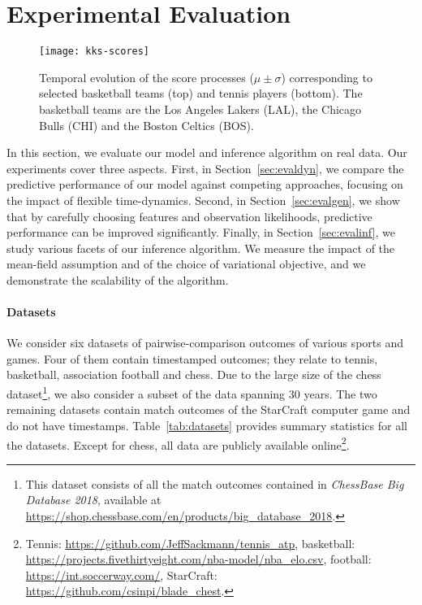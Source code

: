 \section{Experimental Evaluation}
\label{sec:eval}

\begin{figure*}[t]
	\texttt{[image: kks-scores]}
	\caption{
		Temporal evolution of the score processes ($\mu \pm \sigma$) corresponding to selected basketball teams (top) and tennis players (bottom).
		The basketball teams are the Los Angeles Lakers (LAL), the Chicago Bulls (CHI) and the Boston Celtics (BOS).}
	\label{fig:scores}
\end{figure*}

In this section, we evaluate our model and inference algorithm on real data.
Our experiments cover three aspects.
First, in Section~\ref{sec:evaldyn}, we compare the predictive performance of our model against competing approaches, focusing on the impact of flexible time-dynamics.
Second, in Section~\ref{sec:evalgen}, we show that by carefully choosing features and observation likelihoods, predictive performance can be improved significantly.
Finally, in Section~\ref{sec:evalinf}, we study various facets of our inference algorithm.
We measure the impact of the mean-field assumption and of the choice of variational objective, and we demonstrate the scalability of the algorithm.

\paragraph{Datasets}
We consider six datasets of pairwise-comparison outcomes of various sports and games.
Four of them contain timestamped outcomes; they relate to tennis, basketball, association football and chess.
Due to the large size of the chess dataset\footnote{%
	This dataset consists of all the match outcomes contained in \emph{ChessBase Big Database 2018}, available at \url{https://shop.chessbase.com/en/products/big_database_2018}.}, we also consider a subset of the data spanning 30 years.
The two remaining datasets contain match outcomes of the StarCraft computer game and do not have timestamps.
Table~\ref{tab:datasets} provides summary statistics for all the datasets.
Except for chess, all data are publicly available online\footnote{%
	Tennis: \url{https://github.com/JeffSackmann/tennis_atp},
	basketball: \url{https://projects.fivethirtyeight.com/nba-model/nba_elo.csv},
	football: \url{https://int.soccerway.com/},
	StarCraft: \url{https://github.com/csinpi/blade_chest}.
}.

